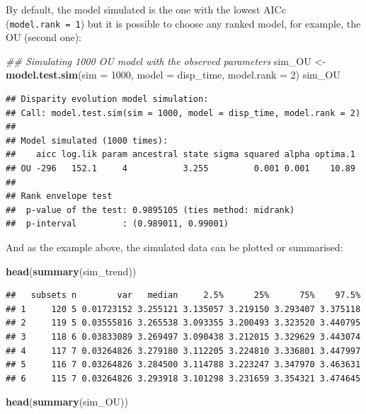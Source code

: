 \documentclass[
]{book}
\newenvironment{Shaded}{\begin{snugshade}}{\end{snugshade}}
\newcommand{\CommentTok}[1]{\textcolor[rgb]{0.56,0.35,0.01}{\textit{#1}}}
\newcommand{\DataTypeTok}[1]{\textcolor[rgb]{0.13,0.29,0.53}{#1}}
\newcommand{\DecValTok}[1]{\textcolor[rgb]{0.00,0.00,0.81}{#1}}
\newcommand{\KeywordTok}[1]{\textcolor[rgb]{0.13,0.29,0.53}{\textbf{#1}}}
\newcommand{\NormalTok}[1]{#1}
\newcommand{\StringTok}[1]{\textcolor[rgb]{0.31,0.60,0.02}{#1}}
\begin{document}
By default, the model simulated is the one with the lowest AICc (\texttt{model.rank\ =\ 1}) but it is possible to choose any ranked model, for example, the OU (second one):

\begin{Shaded}
\begin{Highlighting}[]
\CommentTok{\#\# Simulating 1000 OU model with the observed parameters}
\NormalTok{sim\_OU \textless{}{-}}\StringTok{ }\KeywordTok{model.test.sim}\NormalTok{(}\DataTypeTok{sim =} \DecValTok{1000}\NormalTok{, }\DataTypeTok{model =}\NormalTok{ disp\_time,}
                         \DataTypeTok{model.rank =} \DecValTok{2}\NormalTok{)}
\NormalTok{sim\_OU}
\end{Highlighting}
\end{Shaded}

\begin{verbatim}
## Disparity evolution model simulation:
## Call: model.test.sim(sim = 1000, model = disp_time, model.rank = 2) 
## 
## Model simulated (1000 times):
##    aicc log.lik param ancestral state sigma squared alpha optima.1
## OU -296   152.1     4           3.255         0.001 0.001    10.89
## 
## Rank envelope test
##  p-value of the test: 0.9895105 (ties method: midrank)
##  p-interval         : (0.989011, 0.99001)
\end{verbatim}

And as the example above, the simulated data can be plotted or summarised:

\begin{Shaded}
\begin{Highlighting}[]
\KeywordTok{head}\NormalTok{(}\KeywordTok{summary}\NormalTok{(sim\_trend))}
\end{Highlighting}
\end{Shaded}

\begin{verbatim}
##   subsets n        var   median     2.5%      25%      75%    97.5%
## 1     120 5 0.01723152 3.255121 3.135057 3.219150 3.293407 3.375118
## 2     119 5 0.03555816 3.265538 3.093355 3.200493 3.323520 3.440795
## 3     118 6 0.03833089 3.269497 3.090438 3.212015 3.329629 3.443074
## 4     117 7 0.03264826 3.279180 3.112205 3.224810 3.336801 3.447997
## 5     116 7 0.03264826 3.284500 3.114788 3.223247 3.347970 3.463631
## 6     115 7 0.03264826 3.293918 3.101298 3.231659 3.354321 3.474645
\end{verbatim}

\begin{Shaded}
\begin{Highlighting}[]
\KeywordTok{head}\NormalTok{(}\KeywordTok{summary}\NormalTok{(sim\_OU))}
\end{Highlighting}
\end{Shaded}
\end{document}
